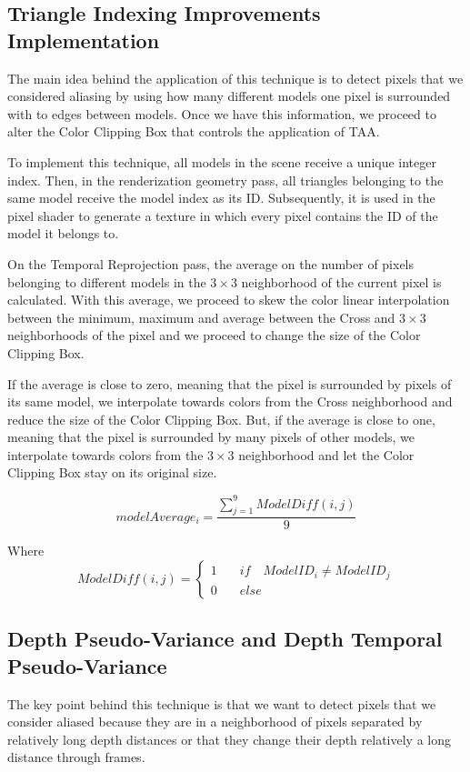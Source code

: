 \documentclass{cslthse-msc}
\begin{document}
\subsection{Triangle Indexing Improvements Implementation}
The main idea behind the application of this technique is to detect pixels that we considered aliasing by using how many different models one pixel is surrounded with to edges between models. Once we have this information, we proceed to alter the Color Clipping Box that controls the application of TAA.

To implement this technique, all models in the scene receive a unique integer index. Then, in the renderization geometry pass, all triangles belonging to the same model receive the model index as its ID. Subsequently, it is used in the pixel shader to generate a texture in which every pixel contains the ID of the model it belongs to.

On the Temporal Reprojection pass, the average on the number of pixels belonging to different models in the $3\times 3$ neighborhood of the current pixel is calculated. With this average, we proceed to skew the color linear interpolation between the minimum, maximum and average between the Cross and $3\times 3$ neighborhoods of the pixel and we proceed to change the size of the Color Clipping Box. 

If the average is close to zero, meaning that the pixel is surrounded by pixels of its same model, we interpolate towards colors from the Cross neighborhood and reduce the size of the Color Clipping Box. But, if the average is close to one, meaning that the pixel is surrounded by many pixels of other models, we interpolate towards colors from the $3\times 3$ neighborhood and let the Color Clipping Box stay on its original size.

\begin{equation}\label{eq:model_index_acc}
modelAverage_i = \frac{\sum\limits_{j=1}^{9} ModelDiff(i,j)}{9} 
\end{equation}

Where
\begin{equation*}
ModelDiff(i,j) = \left\lbrace \begin{split}1\quad & if\quad ModelID_i \neq ModelID_j \\ 0\quad & else\end{split} \right.
\end{equation*}

\subsection{Depth Pseudo-Variance and Depth Temporal Pseudo-Variance}
The key point behind this technique is that we want to detect pixels that we consider aliased because they are in a neighborhood of pixels separated by relatively long depth distances or that they change their depth relatively a long distance through frames. 
\end{document}
